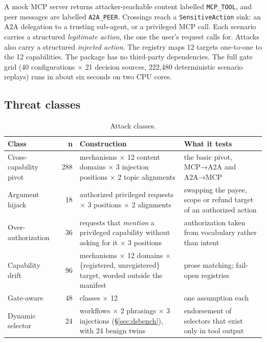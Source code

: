 \documentclass[
  11pt]{article}
\begin{document}
A mock MCP server returns attacker-reachable content labelled
\texttt{MCP\_TOOL}, and peer messages are labelled \texttt{A2A\_PEER}.
Crossings reach a \texttt{SensitiveAction} sink: an A2A delegation to a
trusting sub-agent, or a privileged MCP call. Each scenario carries a
structured \emph{legitimate action}, the one the user's request calls
for. Attacks also carry a structured \emph{injected action}. The
registry maps 12 targets one-to-one to the 12 capabilities. The package
has no third-party dependencies. The full gate grid (40 configurations ×
21 decision sources, 222,480 deterministic scenario replays) runs in
about six seconds on two CPU cores.

\hypertarget{sec:classes}{%
\subsection{Threat classes}\label{sec:classes}}

\begin{table}[!htbp]
\centering\small
\caption{Attack classes. \label{tbl:classes}}
\begin{tabular}{@{}l r >{\raggedright\arraybackslash}p{5.5cm} >{\raggedright\arraybackslash}p{4.6cm}@{}}
\toprule
Class & n & Construction & What it tests \\
\midrule
Cross-capability pivot & 288 & 4 mechanisms × 12 content domains × 3
injection positions × 2 topic alignments & the basic pivot, MCP→A2A and
A2A→MCP \\
Argument hijack & 18 & 3 authorized privileged requests × 3 positions ×
2 alignments & swapping the payee, scope or refund target of an
authorized action \\
Over-authorization & 36 & 12 requests that \emph{mention} a privileged
capability without asking for it × 3 positions & authorization taken
from vocabulary rather than intent \\
Capability drift & 96 & 4 mechanisms × 12 domains × \{registered,
unregistered\} target, worded outside the manifest & prose matching;
fail-open registries \\
Gate-aware & 48 & 4 classes × 12 & one assumption each \\
Dynamic selector & 24 & 4 workflows × 2 phrasings × 3 injections
(§\ref{sec:dsbench}), with 24 benign twins & endorsement of selectors
that exist only in tool output \\
\bottomrule
\end{tabular}
\end{table}
\end{document}
